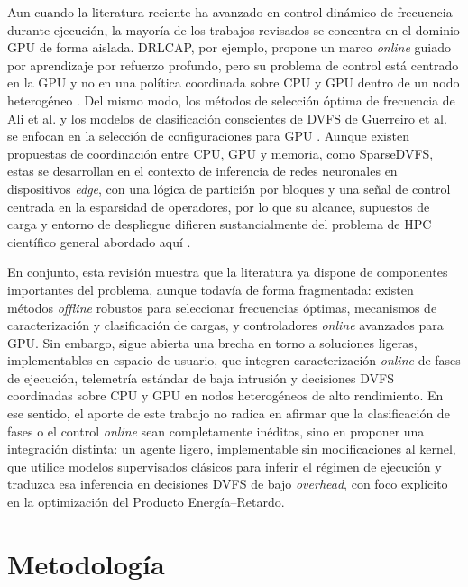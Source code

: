 \documentclass[12pt,oneside,spanish]{book}
\begin{document}
Aun cuando la literatura reciente ha avanzado en control dinámico de frecuencia durante ejecución, la mayoría de los trabajos revisados se concentra en el dominio GPU de forma aislada. DRLCAP, por ejemplo, propone un marco \textit{online} guiado por aprendizaje por refuerzo profundo, pero su problema de control está centrado en la GPU y no en una política coordinada sobre CPU y GPU dentro de un nodo heterogéneo \cite{Wang2024}. Del mismo modo, los métodos de selección óptima de frecuencia de Ali et al. y los modelos de clasificación conscientes de DVFS de Guerreiro et al. se enfocan en la selección de configuraciones para GPU \cite{Ali2023,Guerreiro2019}. Aunque existen propuestas de coordinación entre CPU, GPU y memoria, como SparseDVFS, estas se desarrollan en el contexto de inferencia de redes neuronales en dispositivos \textit{edge}, con una lógica de partición por bloques y una señal de control centrada en la esparsidad de operadores, por lo que su alcance, supuestos de carga y entorno de despliegue difieren sustancialmente del problema de HPC científico general abordado aquí \cite{Zhang2026}.

En conjunto, esta revisión muestra que la literatura ya dispone de componentes importantes del problema, aunque todavía de forma fragmentada: existen métodos \textit{offline} robustos para seleccionar frecuencias óptimas, mecanismos de caracterización y clasificación de cargas, y controladores \textit{online} avanzados para GPU. Sin embargo, sigue abierta una brecha en torno a soluciones ligeras, implementables en espacio de usuario, que integren caracterización \textit{online} de fases de ejecución, telemetría estándar de baja intrusión y decisiones DVFS coordinadas sobre CPU y GPU en nodos heterogéneos de alto rendimiento. En ese sentido, el aporte de este trabajo no radica en afirmar que la clasificación de fases o el control \textit{online} sean completamente inéditos, sino en proponer una integración distinta: un agente ligero, implementable sin modificaciones al kernel, que utilice modelos supervisados clásicos para inferir el régimen de ejecución y traduzca esa inferencia en decisiones DVFS de bajo \textit{overhead}, con foco explícito en la optimización del Producto Energía--Retardo.


\chapter{Metodología}
\end{document}
